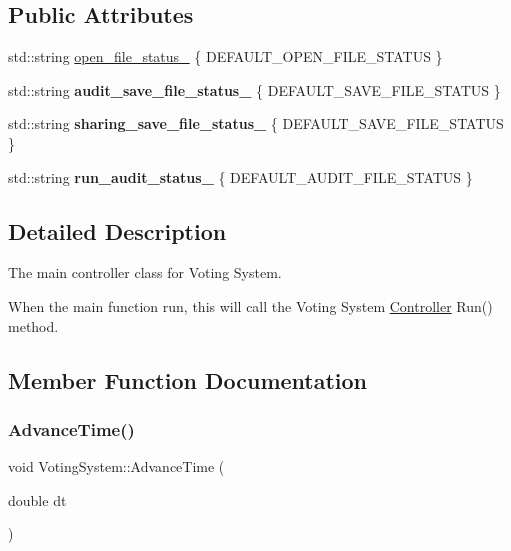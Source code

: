\subsection*{Public Attributes}
\begin{DoxyCompactItemize}
\item 
std\+::string \hyperlink{classVotingSystem_a90e53d556d9dc2117690b34d9dfb7ac4}{open\+\_\+file\+\_\+status\+\_\+} \{ D\+E\+F\+A\+U\+L\+T\+\_\+\+O\+P\+E\+N\+\_\+\+F\+I\+L\+E\+\_\+\+S\+T\+A\+T\+US \}
\item 
\mbox{\label{classVotingSystem_afb2b2d8a30e999fdea663437933caa90}} 
std\+::string {\bfseries audit\+\_\+save\+\_\+file\+\_\+status\+\_\+} \{ D\+E\+F\+A\+U\+L\+T\+\_\+\+S\+A\+V\+E\+\_\+\+F\+I\+L\+E\+\_\+\+S\+T\+A\+T\+US \}
\item 
\mbox{\label{classVotingSystem_a6965a6fdb6c5650d25fe0d191ba5bed0}} 
std\+::string {\bfseries sharing\+\_\+save\+\_\+file\+\_\+status\+\_\+} \{ D\+E\+F\+A\+U\+L\+T\+\_\+\+S\+A\+V\+E\+\_\+\+F\+I\+L\+E\+\_\+\+S\+T\+A\+T\+US \}
\item 
\mbox{\label{classVotingSystem_a621d15f32179de0e4a20e7f60fe6c060}} 
std\+::string {\bfseries run\+\_\+audit\+\_\+status\+\_\+} \{ D\+E\+F\+A\+U\+L\+T\+\_\+\+A\+U\+D\+I\+T\+\_\+\+F\+I\+L\+E\+\_\+\+S\+T\+A\+T\+US \}
\end{DoxyCompactItemize}


\subsection{Detailed Description}
The main controller class for Voting System. 

When the main function run, this will call the Voting System \hyperlink{classController}{Controller} Run() method. 

\subsection{Member Function Documentation}
\mbox{\label{classVotingSystem_a54c0b7c2180d3c158846ecbd61a385ab}} 
\subsubsection{\texorpdfstring{Advance\+Time()}{AdvanceTime()}}
{\footnotesize\ttfamily void Voting\+System\+::\+Advance\+Time (\begin{DoxyParamCaption}\item[{double}]{dt }\end{DoxyParamCaption})}



